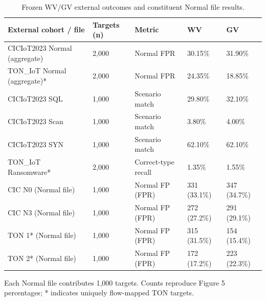 \documentclass[10pt,a4paper]{article}
\begin{document}
\begin{table}[H]\centering\small\setlength{\tabcolsep}{3pt}\renewcommand{\arraystretch}{1.1}

\caption{Frozen WV/GV external outcomes and constituent Normal file results.}\label{sup:diagnostics}

\begin{tabular}{L{0.31\dimexpr{}\tabcolsep\relax}L{0.12\dimexpr{}\tabcolsep\relax}L{0.2\dimexpr{}\tabcolsep\relax}L{0.185\dimexpr{}\tabcolsep\relax}L{0.185\dimexpr{}\tabcolsep\relax}}\toprule

External cohort / file & Targets (n) & Metric & WV & GV\\\midrule

CICIoT2023 Normal (aggregate) & 2,000 & Normal FPR & 30.15\% & 31.90\%\\

TON\_IoT Normal (aggregate)* & 2,000 & Normal FPR & 24.35\% & 18.85\%\\

CICIoT2023 SQL & 1,000 & Scenario match & 29.80\% & 32.10\%\\

CICIoT2023 Scan & 1,000 & Scenario match & 3.80\% & 4.00\%\\

CICIoT2023 SYN & 1,000 & Scenario match & 62.10\% & 62.10\%\\

TON\_IoT Ransomware* & 2,000 & Correct-type recall & 1.35\% & 1.55\%\\

CIC N0 (Normal file) & 1,000 & Normal FP (FPR) & 331 (33.1\%) & 347 (34.7\%)\\

CIC N3 (Normal file) & 1,000 & Normal FP (FPR) & 272 (27.2\%) & 291 (29.1\%)\\

TON 1* (Normal file) & 1,000 & Normal FP (FPR) & 315 (31.5\%) & 154 (15.4\%)\\

TON 2* (Normal file) & 1,000 & Normal FP (FPR) & 172 (17.2\%) & 223 (22.3\%)\\

\bottomrule\end{tabular}\end{table}

Each Normal file contributes 1,000 targets. Counts reproduce Figure 5 percentages; * indicates uniquely flow-mapped TON targets.
\end{document}
